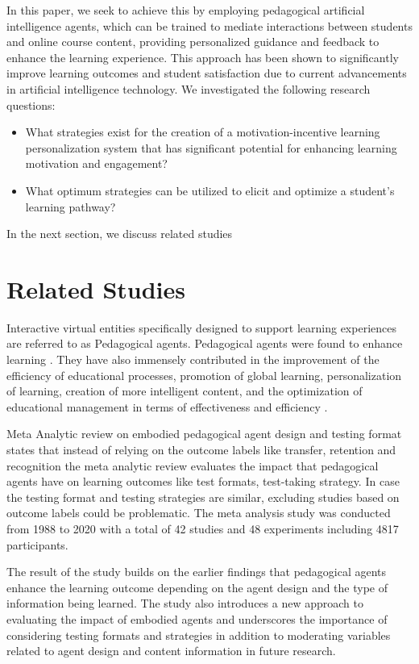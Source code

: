 \documentclass[conference]{IEEEtran}
\begin{document}
In this paper, we seek to achieve this by employing pedagogical artificial intelligence agents, which can be trained to mediate interactions between students and online course content, providing personalized guidance and feedback to enhance the learning experience. This approach has been shown to significantly improve learning outcomes and student satisfaction due to current  advancements in artificial intelligence technology. We investigated the following research questions:

\begin{itemize}
    \item What strategies exist for the creation of a motivation-incentive learning personalization system that has significant potential for enhancing learning motivation and engagement?
    \item What optimum strategies can be utilized to elicit and optimize a student's learning pathway?
\end{itemize}


In the next section, we discuss related studies 

\section{Related Studies}

Interactive virtual entities specifically designed to support learning experiences are referred to as Pedagogical agents. Pedagogical agents were found to enhance learning \cite{kramer2010personalizing}. They have also immensely contributed in the improvement of the efficiency of educational processes, promotion of global learning,  personalization of learning, creation of more intelligent content, and the optimization of educational management in terms of effectiveness and efficiency \cite{iqbal2020smart}.

Meta Analytic review on embodied pedagogical agent design and testing format \cite{davis2023meta} states that instead of relying on the outcome labels like transfer, retention and recognition the meta analytic review evaluates the impact that pedagogical agents have on learning outcomes like test formats, test-taking strategy. In case the testing format and testing strategies are similar, excluding studies based on outcome labels could be problematic. The meta analysis study was conducted from 1988 to 2020 with a total of 42 studies and 48 experiments including 4817 participants.

The result of the study builds on the earlier findings that pedagogical agents enhance the learning outcome depending on the agent design and the type of information being learned. The study also introduces a new approach to evaluating the impact of embodied agents and underscores the importance of considering testing formats and strategies in addition to moderating variables related to agent design and content information in future research. 
\end{document}
